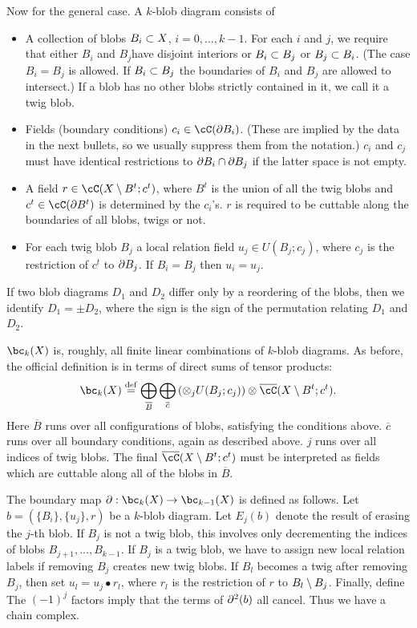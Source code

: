 \documentclass[11pt,leqno]{amsart}
\begin{document}
Now for the general case.
A $k$-blob diagram consists of
\begin{itemize}
\item A collection of blobs $B_i \subset X$, $i = 0, \ldots, k-1$.
For each $i$ and $j$, we require that either $B_i$ and $B_j$have disjoint interiors or
$B_i \subset B_j$ or $B_j \subset B_i$.
(The case $B_i = B_j$ is allowed.
If $B_i \subset B_j$ the boundaries of $B_i$ and $B_j$ are allowed to intersect.)
If a blob has no other blobs strictly contained in it, we call it a twig blob.
\item Fields (boundary conditions) $c_i \in \cC(\bd B_i)$.
(These are implied by the data in the next bullets, so we usually
suppress them from the notation.)
$c_i$ and $c_j$ must have identical restrictions to $\partial B_i \cap \partial B_j$
if the latter space is not empty.
\item A field $r \in \cC(X \setmin B^t; c^t)$,
where $B^t$ is the union of all the twig blobs and $c^t \in \cC(\bd B^t)$
is determined by the $c_i$'s.
$r$ is required to be cuttable along the boundaries of all blobs, twigs or not.
\item For each twig blob $B_j$ a local relation field $u_j \in U(B_j; c_j)$,
where $c_j$ is the restriction of $c^t$ to $\partial B_j$.
If $B_i = B_j$ then $u_i = u_j$.
\end{itemize}

If two blob diagrams $D_1$ and $D_2$ 
differ only by a reordering of the blobs, then we identify
$D_1 = \pm D_2$, where the sign is the sign of the permutation relating $D_1$ and $D_2$.

$\bc_k(X)$ is, roughly, all finite linear combinations of $k$-blob diagrams.
As before, the official definition is in terms of direct sums
of tensor products:
\[
	\bc_k(X) \deq \bigoplus_{\overline{B}} \bigoplus_{\overline{c}}
		\left( \otimes_j U(B_j; c_j)\right) \otimes \lf(X \setmin B^t; c^t) .
\]
Here $\overline{B}$ runs over all configurations of blobs, satisfying the conditions above.
$\overline{c}$ runs over all boundary conditions, again as described above.
$j$ runs over all indices of twig blobs. The final $\lf(X \setmin B^t; c^t)$ must be interpreted as fields which are cuttable along all of the blobs in $\overline{B}$.

The boundary map $\bd : \bc_k(X) \to \bc_{k-1}(X)$ is defined as follows.
Let $b = (\{B_i\}, \{u_j\}, r)$ be a $k$-blob diagram.
Let $E_j(b)$ denote the result of erasing the $j$-th blob.
If $B_j$ is not a twig blob, this involves only decrementing
the indices of blobs $B_{j+1},\ldots,B_{k-1}$.
If $B_j$ is a twig blob, we have to assign new local relation labels
if removing $B_j$ creates new twig blobs.
If $B_l$ becomes a twig after removing $B_j$, then set $u_l = u_j\bullet r_l$,
where $r_l$ is the restriction of $r$ to $B_l \setminus B_j$.
Finally, define
The $(-1)^j$ factors imply that the terms of $\partial^2(b)$ all cancel.
Thus we have a chain complex.
\end{document}
